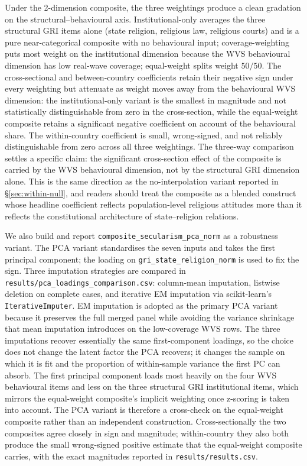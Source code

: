 \documentclass[12pt,a4paper]{article}
\begin{document}
Under the 2-dimension composite, the three weightings produce a clean gradation on the structural--behavioural axis. Institutional-only averages the three structural GRI items alone (state religion, religious law, religious courts) and is a pure near-categorical composite with no behavioural input; coverage-weighting puts most weight on the institutional dimension because the WVS behavioural dimension has low real-wave coverage; equal-weight splits weight $50/50$. The cross-sectional and between-country coefficients retain their negative sign under every weighting but attenuate as weight moves away from the behavioural WVS dimension: the institutional-only variant is the smallest in magnitude and not statistically distinguishable from zero in the cross-section, while the equal-weight composite retains a significant negative coefficient on account of the behavioural share. The within-country coefficient is small, wrong-signed, and not reliably distinguishable from zero across all three weightings. The three-way comparison settles a specific claim: the significant cross-section effect of the composite is carried by the WVS behavioural dimension, not by the structural GRI dimension alone. This is the same direction as the no-interpolation variant reported in \S\ref{sec:within-null}, and readers should treat the composite as a blended construct whose headline coefficient reflects population-level religious attitudes more than it reflects the constitutional architecture of state--religion relations.

We also build and report \texttt{composite\_secularism\_pca\_norm} as a robustness variant. The PCA variant standardises the seven inputs and takes the first principal component; the loading on \texttt{gri\_state\_religion\_norm} is used to fix the sign. Three imputation strategies are compared in \texttt{results/pca\_loadings\_comparison.csv}: column-mean imputation, listwise deletion on complete cases, and iterative EM imputation via scikit-learn's \texttt{IterativeImputer}. EM imputation is adopted as the primary PCA variant because it preserves the full merged panel while avoiding the variance shrinkage that mean imputation introduces on the low-coverage WVS rows. The three imputations recover essentially the same first-component loadings, so the choice does not change the latent factor the PCA recovers; it changes the sample on which it is fit and the proportion of within-sample variance the first PC can absorb. The first principal component loads most heavily on the four WVS behavioural items and less on the three structural GRI institutional items, which mirrors the equal-weight composite's implicit weighting once z-scoring is taken into account. The PCA variant is therefore a cross-check on the equal-weight composite rather than an independent construction. Cross-sectionally the two composites agree closely in sign and magnitude; within-country they also both produce the small wrong-signed positive estimate that the equal-weight composite carries, with the exact magnitudes reported in \texttt{results/results.csv}.
\end{document}
